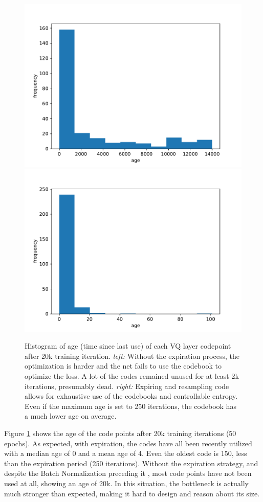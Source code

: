 \begin{figure}
    \centering
    \includegraphics[width=0.45\columnwidth]{60-files/age.pdf}
    \includegraphics[width=0.45\columnwidth]{60-files/age-aging.pdf}
    \caption{Histogram of age (time since last use) of each VQ layer codepoint after 20k training iteration. \emph{left:} Without the expiration process, the optimization is harder and the net fails to use the codebook to optimize the loss. A lot of the codes remained unused for at least 2k iterations, presumably dead. \emph{right:} Expiring and resampling code allows for exhaustive use of the codebooks and controllable entropy. Even if the maximum age is set to 250 iterations, the codebook has a much lower age on average.}
    \label{fig:agingvq-age}
\end{figure}

Figure \ref{fig:agingvq-age} shows the age of the code points after 20k training iterations (50 epochs). As expected, with expiration, the codes have all been recently utilized with a median age of 0 and a mean age of 4. Even the oldest code is 150, less than the expiration period (250 iterations). Without the expiration strategy, and despite the Batch Normalization preceding it \citep{robustvq}, most code points have not been used at all, showing an age of 20k. In this situation, the bottleneck is actually much stronger than expected, making it hard to design and reason about its size.

